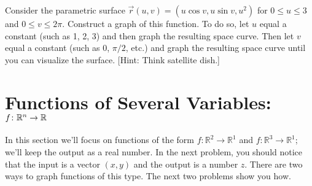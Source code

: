 \begin{problem}\label{second parametric surface example}%
%
 Consider the parametric surface $\vec r(u,v)=(u\cos v, u\sin v, u^2)$ for $0\leq u\leq 3$ and $0\leq v\leq 2 \pi$.
 Construct a graph of this function. To do so, let $u$ equal a constant (such as 1, 2, 3) and then graph the resulting space curve.  Then let $v$ equal a constant (such as 0, $\pi/2$, etc.) and graph the resulting space curve until you can visualize the surface. [Hint: Think satellite dish.] 
\end{problem}


\section{Functions of Several Variables: $f\colon \mathbb{R}^n \to \mathbb{R}$}

In this section we'll focus on functions of the form $f\colon \mathbb{R}^2\to\mathbb{R}^1$ and $f\colon \mathbb{R}^3\to\mathbb{R}^1$; we'll keep the output as a real number. In the next problem, you should notice that the input is a vector $(x,y)$ and the output is a number $z$. There are two ways to graph functions of this type.  The next two problems show you how. 

